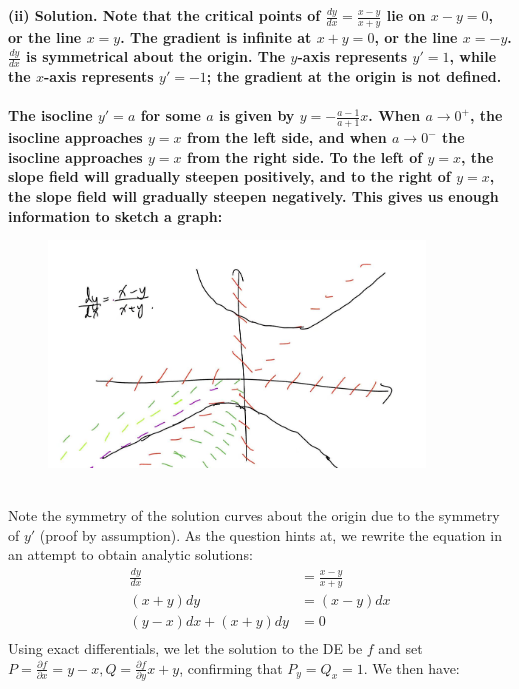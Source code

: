 \documentclass{article}
\begin{document}
\bf (ii) Solution. \normalfont Note that the critical points of $\frac{dy}{dx} = \frac{x-y}{x+y}$ lie on $x-y = 0$, or the line $x=y$. The gradient is infinite at $x+y = 0$, or the line $x = -y$. $\frac{dy}{dx}$ is symmetrical about the origin. The $y$-axis represents $y' = 1$, while the $x$-axis represents $y' = -1$; the gradient at the origin is not defined. 
\\
\\
The isocline $y' = a$ for some $a$ is given by $y = -\frac{a-1}{a+1}x$. When $a \to 0^+$, the isocline approaches $y = x$ from the left side, and when $a \to 0^-$ the isocline approaches $y=x$ from the right side. To the left of $y = x$, the slope field will gradually steepen positively, and to the right of $y=x$, the slope field will gradually steepen negatively. This gives us enough information to sketch a graph:
\begin{figure}[h]
    \centering
    \includegraphics[width=10cm]{DE-ch2-9-2.jpg}
\end{figure}\\
Note the symmetry of the solution curves about the origin due to the symmetry of $y'$ (proof by assumption). As the question hints at, we rewrite the equation in an attempt to obtain analytic solutions:
\begin{equation*}
\begin{aligned}
\frac{dy}{dx} &= \frac{x-y}{x+y} \\
(x+y)dy &= (x-y)dx \\
(y-x)dx + (x+y)dy &= 0 \\
\end{aligned}
\end{equation*}
Using exact differentials, we let the solution to the DE be $f$ and set $P = \frac{\partial f}{\partial x} = y-x, Q = \frac{\partial f}{\partial y} x+y$, confirming that $P_y=Q_x=1$. 
We then have:
\end{document}
